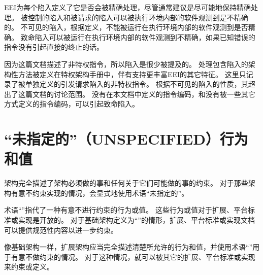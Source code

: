 EEI为每个陷入定义了它是否会被精确处理，尽管通常建议是尽可能地保持精确处理。
被控制的陷入和被请求的陷入可以被执行环境内部的软件观测到是不精确的。
不可见的陷入，根据定义，不能被运行在执行环境内部的软件观测到是否精确。
致命陷入可以被运行在执行环境内部的软件观测到不精确，如果已知错误的指令没有引起直接的终止的话。

因为这篇文档描述了非特权指令，所以陷入是很少被提及的。
处理包含陷入的架构性方法被定义在特权架构手册中，伴有支持更丰富EEI的其它特征。
这里只记录了被单独定义的引发请求陷入的非特权指令。
根据不可见的陷入的性质，其超出了这篇文档的讨论范围。
没有在本文档中定义的指令编码，和没有被一些其它方式定义的指令编码，可以引起致命陷入。

\section{“未指定的”（UNSPECIFIED）行为和值}

架构完全描述了架构必须做的事和任何关于它们可能做的事的约束。
对于那些架构有意不约束实现的情况，会显式地使用术语“\textsc{未指定的}”。

术语“\unspecified”指代了一种有意不进行约束的行为或值。
这些行为或值对于扩展、平台标准或实现是开放的。
对于基础架构定义为“\unspecified”的情形，扩展、平台标准或实现文档可以提供规范性内容以进一步约束。

像基础架构一样，扩展架构应当完全描述清楚所允许的行为和值，并使用术语“\unspecified”用于有意不做约束的情况。
对于这种情况，就可以被其它的扩展、平台标准或实现来约束或定义。
